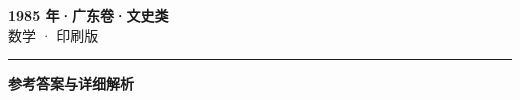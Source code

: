 \documentclass[zihao=5, a4paper]{ctexart}
\begin{document}
\begin{center}
  {\Large\bfseries 1985 年·广东卷·文史类}\\[4pt]
  {\large 数学 · 印刷版}
\end{center}
\medskip
{}

\par\bigskip\hrule\bigskip
{}
\begin{center}{\large\bfseries 参考答案与详细解析}\end{center}
\smallskip

\end{document}
